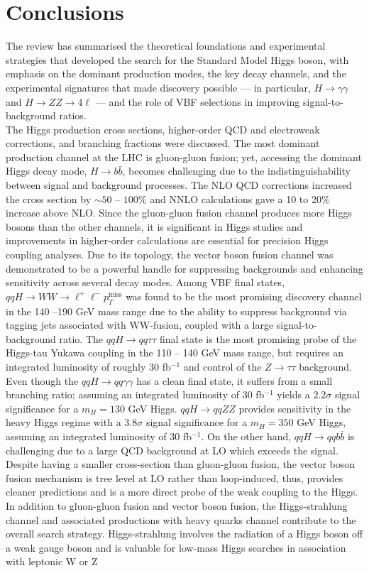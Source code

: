 \documentclass[a4paper,11pt]{article}
\begin{document}
\section{Conclusions}
The review has summarised the theoretical foundations and experimental strategies that developed the search for the Standard Model Higgs boson, with emphasis on the dominant production modes, the key decay channels, and the experimental signatures that made discovery possible --- in particular, $H \rightarrow \gamma \gamma$ and $H \rightarrow ZZ \rightarrow 4 \ell$ --- and the role of VBF selections in improving signal-to-background ratios.\\

The Higgs production cross sections, higher-order QCD and electroweak corrections, and branching fractions were discussed. The most dominant production channel at the LHC is gluon-gluon fusion;  yet, accessing the dominant Higgs decay mode, $H \rightarrow b \bar{b}$, becomes challenging due to the indistinguishability between signal and background processes. The NLO QCD corrections increased the cross section by $\sim 50$ -- $100 \%$ and NNLO calculations gave a 10 to 20$\%$ increase above NLO. Since the gluon-gluon fusion channel produces more Higgs bosons than the other channels, it is significant in Higgs studies and improvements in higher-order calculations are essential for precision Higgs coupling analyses. Due to its topology, the vector boson fusion channel was demonstrated to be a powerful handle for suppressing backgrounds and enhancing sensitivity across several decay modes. Among VBF final states, $qqH \rightarrow WW \rightarrow \ell^+ \ell^- p_T^{\text{miss}} $  was found to be the most promising discovery channel in the 140 --190 GeV mass range due to the ability to suppress background via tagging jets associated with WW-fusion, coupled with a large signal-to-background ratio. The $qqH \rightarrow qq \tau \tau$ final state is the most promising probe of the Higgs-tau Yukawa coupling in the 110 -- 140 GeV mass range, but requires an integrated luminosity of roughly  30 fb$^{-1}$ and control of the $Z \rightarrow \tau \tau$ background. Even though the $qqH \rightarrow qq \gamma \gamma$ has a clean final state, it suffers from a small branching ratio; assuming an integrated luminosity of 30 fb$^{-1}$ yields a $2.2 \sigma$ signal significance for a $m_H = 130$ GeV Higgs.  $qqH \rightarrow qqZZ$ provides sensitivity in the heavy Higgs regime with a $3.8 \sigma$ signal significance for a $m_H = 350$ GeV Higgs, assuming an integrated luminosity of 30 fb$^{-1}$.  On the other hand, $qqH \rightarrow qq b\bar{b}$ is challenging due to a large QCD background at LO which exceeds the signal. Despite having a smaller cross-section than gluon-gluon fusion, the vector boson fusion mechanism is tree level at LO rather than loop-induced, thus, provides cleaner predictions and is a more direct probe of the weak coupling to the Higgs. In addition to gluon-gluon fusion and vector boson fusion, the Higgs-strahlung channel and associated productions with heavy quarks channel contribute to the overall search strategy. Higgs-strahlung involves the radiation of a Higgs boson off a weak gauge boson and is  valuable for low-mass Higgs searches in association with leptonic W or Z 
\end{document}
